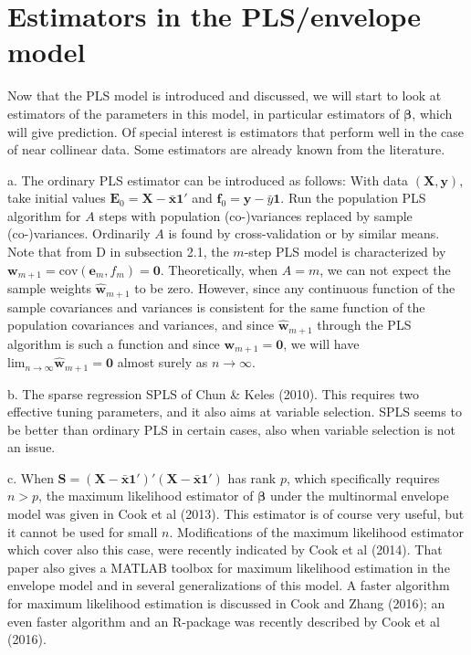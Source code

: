 \documentclass[11pt]{article}
\begin{document}
\section{Estimators in the PLS/envelope model}

Now that the PLS model is introduced and discussed, we will start to look at estimators of the parameters in this model, in particular estimators of $\bm{\beta}$, which will give prediction. Of special interest is estimators that perform well in the case of near collinear data. Some estimators are already known from the literature.

a. The ordinary PLS estimator can be introduced as follows: With data $(\bm{X},\bm{y})$, take initial values $\bm{E}_{0}=\bm{X}-\bar{\bm{x}}\bm{1}'$ 
and $\bm{f}_{0}=\bm{y}-\bar{y}\bm{1}$. Run the population PLS algorithm for $A$ steps with population (co-)variances replaced by sample (co-)variances. 
Ordinarily $A$ is found by cross-validation or by similar means. Note that from D in subsection 2.1, the $m$-step PLS model is characterized by $\bm{w}_{m+1}=\mathrm{cov}(\bm{e}_m,f_m)=\bm{0}$. Theoretically, when $A=m$, we can not expect the sample weights $\widehat{\bm{w}}_{m+1}$ 
to be zero. However, since any continuous function of the sample covariances and variances is consistent for the same function of the 
population covariances and variances, and since  $\widehat{\bm{w}}_{m+1}$ through the PLS algorithm is such a function and since $\bm{w}_{m+1}=\bm{0}$, we will have ${\mathrm{lim}_{n\rightarrow\infty}}\widehat{\bm{w}}_{m+1}=\bm{0}$ almost surely as $n\rightarrow\infty$.
\smallskip

b. The sparse regression SPLS of Chun \& Keles (2010). This requires two effective tuning parameters, and it also aims at variable selection. SPLS seems to be better than ordinary PLS in certain cases, also when variable selection is not an issue.
\smallskip

c. When $\bm{S}=(\bm{X}-\bar{\bm{x}}\bm{1}')'(\bm{X}-\bar{\bm{x}}\bm{1}')$ has rank $p$, which specifically requires $n>p$, the maximum likelihood 
estimator of $\bm{\beta}$ under the multinormal envelope model was given in Cook et al (2013). This estimator is of course very useful, but it cannot be used for small $n$. Modifications of the maximum likelihood estimator which cover also this case, were recently indicated by Cook et al (2014). That paper also gives a MATLAB toolbox for maximum likelihood estimation in the envelope model and in several generalizations of this model. A faster algorithm for maximum likelihood estimation is discussed in Cook and Zhang (2016); an even faster algorithm and an R-package was recently described by Cook et al (2016).
\smallskip
\end{document}
